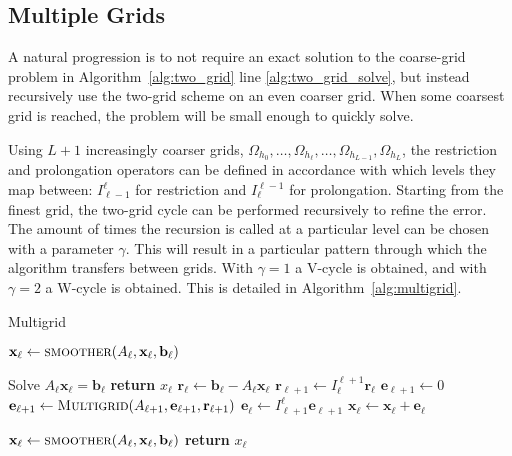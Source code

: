 \subsection{Multiple Grids}

A natural progression is to not require an exact solution to the coarse-grid problem in Algorithm~\ref{alg:two_grid} line \ref{alg:two_grid_solve}, but instead recursively use the two-grid scheme on an even coarser grid. When some coarsest grid is reached, the problem will be small enough to quickly solve.

Using $L + 1$ increasingly coarser grids, $\Omega_{h_0}, \ldots, \Omega_{h_{\ell}}, \ldots, \Omega_{h_{L-1}}, \Omega_{h_L}$, the restriction and prolongation operators can be defined in accordance with which levels they map between: $I_{\ell-1}^\ell$ for restriction and $I_\ell^{\ell-1}$ for prolongation. Starting from the finest grid, the two-grid cycle can be performed recursively to refine the error. The amount of times the recursion is called at a particular level can be chosen with a parameter $\gamma$. This will result in a particular pattern through which the algorithm transfers between grids. With $\gamma = 1$ a V-cycle is obtained, and with $\gamma = 2$ a W-cycle is obtained. This is detailed in Algorithm~\ref{alg:multigrid}.

\begin{algorithm}
	\caption{Multigrid}\label{alg:multigrid}
	\begin{algorithmic}[1]
			\State $\mathbf{x}_\ell \gets \Call{smoother}{A_\ell, \mathbf{x}_\ell, \mathbf{b}_\ell}$ 
		\EndFor

			\State Solve $A_\ell \mathbf{x}_\ell = \mathbf{b}_\ell$ 
			\State \textbf{return} $x_\ell$
		\Else
			\State $\mathbf{r}_\ell \gets \mathbf{b}_\ell - A_\ell \mathbf{x}_\ell$ 
			\State $\mathbf{r}_{\ell+1} \gets I_{\ell}^{\ell + 1} \mathbf{r}_\ell$ 
			\State $\mathbf{e}_{\ell+1} \gets 0$
				\State $\mathbf{e}_{\ell+1} \gets \Call{Multigrid}{A_{\ell+1}, \mathbf{e}_{\ell+1}, \mathbf{r}_{\ell+1}}$ 
			\EndFor
			\State $\mathbf{e}_{\ell} \gets I_{\ell + 1}^{\ell} \mathbf{e}_{\ell+1}$ 
			\State $\mathbf{x}_{\ell} \gets \mathbf{x}_{\ell} + \mathbf{e}_{\ell}$ 
		\EndIf

			\State $\mathbf{x}_\ell \gets \Call{smoother}{A_\ell, \mathbf{x}_\ell, \mathbf{b}_\ell}$ 
		\EndFor
		\State \textbf{return} $x_\ell$
		\EndProcedure
	\end{algorithmic}
\end{algorithm}


